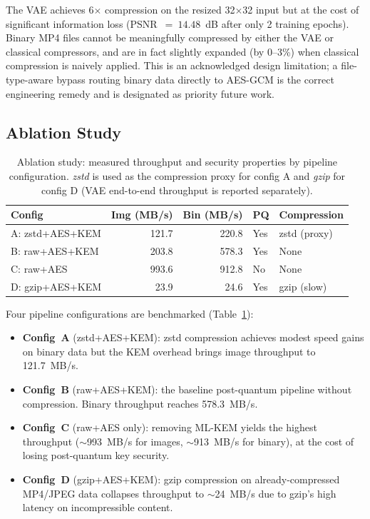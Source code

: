 \documentclass[twocolumn]{article}
\begin{document}
The VAE achieves 6$\times$ compression on the resized 32$\times$32 input but at
the cost of significant information loss (PSNR~$=~14.48$~dB after only 2 training
epochs). Binary MP4 files cannot be meaningfully compressed by either the VAE or
classical compressors, and are in fact slightly expanded (by 0--3\%) when
classical compression is naively applied. This is an acknowledged design
limitation; a file-type-aware bypass routing binary data directly to AES-GCM is
the correct engineering remedy and is designated as priority future work.

\subsection{Ablation Study}

\begin{table}[t]
\caption{Ablation study: measured throughput and security properties by pipeline
configuration. \emph{zstd} is used as the compression proxy for config A and
\emph{gzip} for config D (VAE end-to-end throughput is reported separately).}
\label{tab:ablation}
\centering\small
\begin{tabular}{p{2.2cm}rrll}
\toprule
Config & Img (MB/s) & Bin (MB/s) & PQ & Compression \\
\midrule
A: zstd+AES+KEM & 121.7 & 220.8 & Yes & zstd (proxy) \\
B: raw+AES+KEM & 203.8 & 578.3 & Yes & None \\
C: raw+AES & 993.6 & 912.8 & No & None \\
D: gzip+AES+KEM & 23.9 & 24.6 & Yes & gzip (slow) \\
\bottomrule
\end{tabular}
\end{table}

Four pipeline configurations are benchmarked (Table~\ref{tab:ablation}):

\begin{itemize}
  \item \textbf{Config~A} (zstd+AES+KEM): zstd compression achieves modest speed
  gains on binary data but the KEM overhead brings image throughput to 121.7~MB/s.
  \item \textbf{Config~B} (raw+AES+KEM): the baseline post-quantum pipeline
  without compression. Binary throughput reaches 578.3~MB/s.
  \item \textbf{Config~C} (raw+AES only): removing ML-KEM yields the highest
  throughput ($\sim$993~MB/s for images, $\sim$913~MB/s for binary), at the cost
  of losing post-quantum key security.
  \item \textbf{Config~D} (gzip+AES+KEM): gzip compression on already-compressed
  MP4/JPEG data collapses throughput to $\sim$24~MB/s due to gzip's high
  latency on incompressible content.
\end{itemize}
\end{document}
